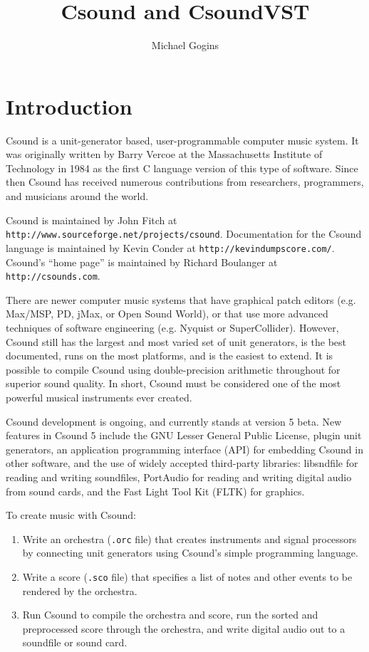 \documentclass[10pt,letterpaper,onecolumn]{article}
\begin{document}
\title{Csound and CsoundVST}
\author{Michael Gogins}
\maketitle
{}
\section{Introduction}
Csound is a unit-generator based, user-programmable computer music system. It was originally written by Barry Vercoe at the Massachusetts Institute of Technology in 1984 as the first C language version of this type of software. Since then Csound has received numerous contributions from researchers, programmers, and musicians around the world. 

Csound is maintained by John Fitch at \texttt{http://www.sourceforge.net/projects/csound}. Documentation for the Csound language is maintained by Kevin Conder at \texttt{http://kevindumpscore.com/}. Csound's ``home page'' is maintained by Richard Boulanger at \texttt{http://csounds.com}. 

There are newer computer music systems that have graphical patch editors (e.g. Max/MSP, PD, jMax, or Open Sound World), or that use more advanced techniques of software engineering (e.g. Nyquist or SuperCollider). However, Csound still has the largest and most varied set of unit generators, is the best documented, runs on the most platforms, and is the easiest to extend. It is possible to compile Csound using double-precision arithmetic throughout for superior sound quality. In short, Csound must be considered one of the most powerful musical instruments ever created.

Csound development is ongoing, and currently stands at version 5 beta. New features in Csound 5 include the GNU Lesser General Public License, plugin unit generators, an application programming interface (API) for embedding Csound in other software, and the use of widely accepted third-party libraries: libsndfile for reading and writing soundfiles, PortAudio for reading and writing digital audio from sound cards, and the Fast Light Tool Kit (FLTK) for graphics.

To create music with Csound:
\begin{enumerate}
\item Write an orchestra (\texttt{.orc} file) that creates instruments and signal processors by connecting unit generators using Csound's simple programming language.
\item Write a score (\texttt{.sco} file) that specifies a list of notes and other events to be rendered by the orchestra.
\item Run Csound to compile the orchestra and score, run the sorted and preprocessed score through the orchestra, and write digital audio out to a soundfile or sound card.
\end{enumerate}
\end{document}
